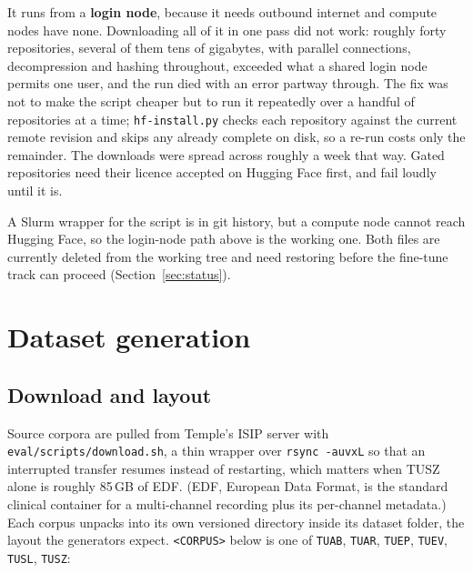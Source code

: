\documentclass[11pt,a4paper]{article}
\newcommand{\file}[1]{{\small\texttt{#1}}}
\begin{document}
It runs from a \textbf{login node}, because it needs outbound internet and
compute nodes have none. Downloading all of it in one pass did not work: roughly
forty repositories, several of them tens of gigabytes, with parallel connections,
decompression and hashing throughout, exceeded what a shared login node permits
one user, and the run died with an error partway through. The fix was not to make
the script cheaper but to run it repeatedly over a handful of repositories at a
time; \file{hf-install.py} checks each repository against the current remote
revision and skips any already complete on disk, so a re-run costs only the
remainder. The downloads were spread across roughly a week that way. Gated
repositories need their licence accepted on Hugging Face first, and fail loudly
until it is.

A Slurm wrapper for the script is in git history, but a compute node cannot reach
Hugging Face, so the login-node path above is the working one. Both files are
currently deleted from the working tree and need restoring before the fine-tune
track can proceed (Section~\ref{sec:status}).

\section{Dataset generation}

\subsection{Download and layout}

Source corpora are pulled from Temple's ISIP server with
\file{eval/scripts/download.sh}, a thin wrapper over \texttt{rsync -auvxL} so that
an interrupted transfer resumes instead of restarting, which matters when TUSZ
alone is roughly 85\,GB of EDF. (EDF, European Data Format, is the standard
clinical container for a multi-channel recording plus its per-channel metadata.)
Each corpus unpacks into its own versioned directory inside its dataset folder,
the layout the generators expect. \file{<CORPUS>} below is one of \texttt{TUAB},
\texttt{TUAR}, \texttt{TUEP}, \texttt{TUEV}, \texttt{TUSL}, \texttt{TUSZ}:
\end{document}

